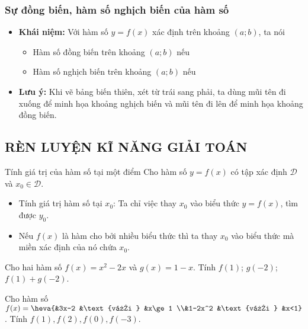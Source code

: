 \subsubsection{Sự đồng biến, hàm số nghịch biến của hàm số}
\begin{itemize}
	\item [\faSunO] \textbf{Khái niệm:} Với hàm số $y=f(x)$ xác định trên khoảng $(a;b)$, ta nói
	\begin{itemize}
		\item [\iconCH] Hàm số đồng biến trên khoảng $(a;b)$ nếu
		\item [\iconCH] Hàm số nghịch biến trên khoảng $(a;b)$ nếu
	\end{itemize}
	\item [\faSunO] \textbf{Lưu ý:} Khi vẽ bảng biến thiên, xét từ trái sang phải, ta dùng mũi tên đi xuống để minh họa khoảng nghịch biến và mũi tên đi lên để minh họa khoảng đồng biến. 
\end{itemize}

\subsection{RÈN LUYỆN KĨ NĂNG GIẢI TOÁN}
\begin{dang}{Tính giá trị của hàm số tại một điểm}
	Cho hàm số $y=f(x)$ có tập xác định $\mathscr{D}$ và $x_0 \in \mathscr{D}$.
	\begin{itemize}
		\item[\faPencilSquareO] Tính giá trị hàm số tại $x_0$: Ta chỉ việc thay $x_0$ vào biểu thức $y=f(x)$, tìm được $y_0$.
		\item[\faPencilSquareO] Nếu $f(x)$ là hàm cho bởi nhiều biểu thức thì ta thay $x_0$ vào biểu thức mà miền xác định của nó chứa $x_0$.
	\end{itemize}
\end{dang}

\begin{vd}
	Cho hai hàm số $f(x)=x^2-2x$ và $g(x)=1-x$. Tính $f(1)$; $g(-2)$; $f(1)+g(-2)$.
	\loigiai{}
\end{vd}

\begin{vd}
	Cho hàm số $f(x)=\heva{&3x-2 &\text{với } &x\ge 1 \\&1-2x^2 &\text{với } &x<1}$. Tính $f(1), f(2), f(0), f(-3)$.
		\loigiai{}
\end{vd}



